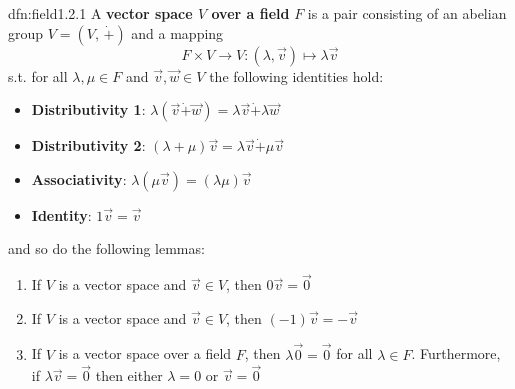 \documentclass[landscape, 8pt]{extarticle}
\begin{document}
\begin{multicols}{3}
\begin{dfn}{dfn:field}{1.2.1}
    A \textbf{vector space $V$ over a field} $F$ is a pair consisting of an abelian group $V = (V,\, \dot{+})$ and a mapping
    \[F \times V \to V : (\lambda, \vec{v})\mapsto \lambda \vec{v}\]
    s.t. for all $\lambda, \mu \in F$ and $\vec{v}, \vec{w}\in V$ the following identities hold:

    \vspace{-5pt}
    \begin{itemize}
        \setlength\itemsep{0em}
        \item \textbf{Distributivity 1}: $\lambda(\vec{v} \dot{+} \vec{w}) = \lambda\vec{v} \dot{+} \lambda \vec{w}$
        \item \textbf{Distributivity 2}: $(\lambda + \mu)\vec{v} = \lambda \vec{v} \dot{+} \mu \vec{v}$
        \item \textbf{Associativity}: $\lambda (\mu \vec{v}) = (\lambda \mu) \vec{v}$
        \item \textbf{Identity}: $1\vec{v} = \vec{v}$
    \end{itemize}
    \vspace{-5pt}
    and so do the following lemmas:

    \vspace{-5pt}
    \begin{enumerate}
        \setlength\itemsep{0em}
        \item[\textbf{1.2.2}:] If $V$ is a vector space and $\vec{v}\in V$, then $0 \vec{v} = \vec{0}$
        \item[\textbf{1.2.3}:] If $V$ is a vector space and $\vec{v}\in V$, then $(-1)\vec{v} = -\vec{v}$
        \item[\textbf{1.2.4}:] If $V$ is a vector space over a field $F$, then $\lambda \vec{0} = \vec{0}$ for all $\lambda\in F$. Furthermore, if $\lambda \vec{v} = \vec{0}$ then either $\lambda = 0$ or $\vec{v} = \vec{0}$
    \end{enumerate}
\end{dfn}




\end{multicols}
\end{document}
